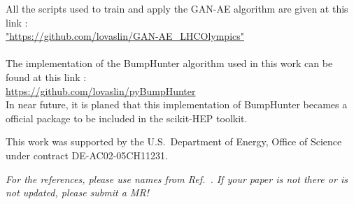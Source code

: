 \documentclass[letterpaper,11pt]{article}
\begin{document}
\noindent All the scripts used to train and apply the GAN-AE algorithm are given at this link :\\
\href{"https://github.com/lovaslin/GAN-AE\_LHCOlympics"}{"https://github.com/lovaslin/GAN-AE\_LHCOlympics"}\\ \\

\noindent The implementation of the BumpHunter algorithm used in this work can be found at this link :\\
\href{https://github.com/lovaslin/pyBumpHunter}{https://github.com/lovaslin/pyBumpHunter}\\
\noindent In near future, it is planed that this implementation of BumpHunter becames a official package to be included in the scikit-HEP toolkit.

\acknowledgments

This work was supported by the U.S.~Department of Energy, Office of Science under contract DE-AC02-05CH11231. 

\vspace{10mm}

\noindent \textit{For the references, please use names from Ref.~\cite{hepmllivingreview}.  If your paper is not there or is not updated, please submit a MR!}



\end{document}
